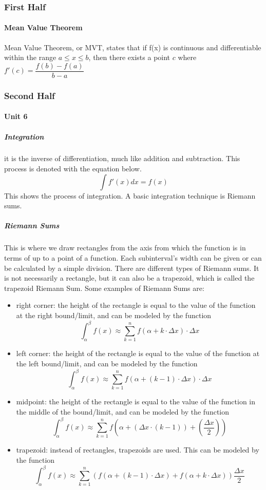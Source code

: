 \documentclass{article} %
\theoremstyle{theorem}
\theoremstyle{definition}
\begin{document}
        \subsubsection{First Half}
            \paragraph{Mean Value Theorem} %
            \label{ssub:Mean Value Theorem}
                Mean Value Theorem, or MVT, states that if f(x) is continuous and differentiable within the range $a\le x \le b$, then there exists a point $c$ where $f'(c) = \dfrac{f(b)-f(a)}{b-a}$
        \subsubsection{Second Half}
            \paragraph{Unit 6}
                \subparagraph{Integration}
                    it is the inverse of differentiation, much like addition and subtraction. This process is denoted with the equation below.
                    $$\int f'(x)dx = f(x)$$
                    This shows the process of integration. A basic integration technique is Riemann sums.
                \subparagraph{Riemann Sums}
                    This is where we draw rectangles from the axis from which the function is in terms of up to a point of a function. Each subinterval's width can be given or can be calculated by a simple division. There are different types of Riemann sums.
                    It is not necessarily a rectangle, but it can also be a trapezoid, which is called the trapezoid Riemann Sum.
                    Some examples of Riemann Sums are:
                    \begin{itemize}
                        \item right corner: the height of the rectangle is equal to the value of the function at the right bound/limit, and can be modeled by the function $$\int_\alpha^\beta f(x)\approx \sum_{k=1}^{n}f(\alpha+k \cdot \Delta x)\cdot\Delta x$$
                        \item left corner: the height of the rectangle is equal to the value of the function at the left bound/limit, and can be modeled by the function $$\int_\alpha^\beta f(x) \approx \sum_{k=1}^{n}f(\alpha+(k-1)\cdot \Delta x)\cdot\Delta x$$
                        \item midpoint: the height of the rectangle is equal to the value of the function in the middle of the bound/limit, and can be modeled by the function $$\int_\alpha^\beta f(x)\approx \sum_{k=1}^{n}f(\alpha+(\Delta x\cdot(k-1))+(\frac{\Delta x}{2}))$$
                    \item trapezoid: instead of rectangles, trapezoids are used. This can be modeled by the function $$\int_\alpha^\beta f(x)\approx \sum_{k=1}^{n}(f(\alpha+(k-1)\cdot\Delta x)+f(\alpha+k\cdot\Delta x))\frac{\Delta x}{2}$$
                    \end{itemize}
\end{document}
